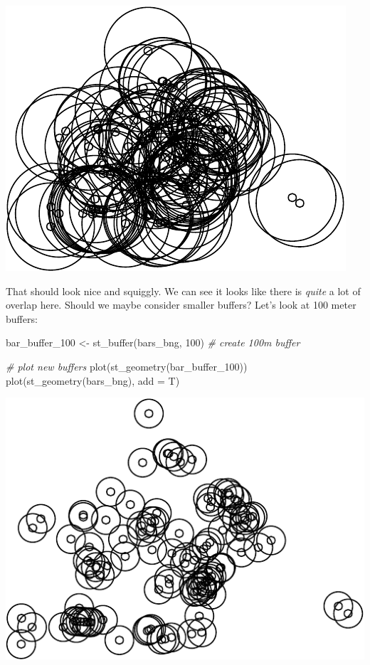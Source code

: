 \documentclass[
  krantz2]{krantz}
\makeatletter
\newenvironment{Shaded}{\begin{snugshade}}{\end{snugshade}}
\newcommand{\AttributeTok}[1]{\textcolor[rgb]{0.61,0.61,0.61}{#1}}
\newcommand{\CommentTok}[1]{\textcolor[rgb]{0.37,0.37,0.37}{\textit{#1}}}
\newcommand{\DecValTok}[1]{\textcolor[rgb]{0.06,0.06,0.06}{#1}}
\newcommand{\FunctionTok}[1]{\textcolor[rgb]{0,0,0}{#1}}
\newcommand{\NormalTok}[1]{#1}
\newcommand{\OtherTok}[1]{\textcolor[rgb]{0.37,0.37,0.37}{#1}}
\newenvironment{kframe}{%
\medskip{}
\setlength{\fboxsep}{.8em}
 \def\at@end@of@kframe{}%
 \ifinner\ifhmode%
  \def\at@end@of@kframe{\end{minipage}}%
  \begin{minipage}{\columnwidth}%
 \fi\fi%
 \def\FrameCommand##1{\hskip\@totalleftmargin \hskip-\fboxsep
 \colorbox{shadecolor}{##1}\hskip-\fboxsep
     \hskip-\linewidth \hskip-\@totalleftmargin \hskip\columnwidth}%
 \MakeFramed {\advance\hsize-\width
   \@totalleftmargin\z@ \linewidth\hsize
   \@setminipage}}%
 {\par\unskip\endMakeFramed%
 \at@end@of@kframe}
\renewenvironment{Shaded}{\begin{kframe}}{\end{kframe}}
\makeatother
\begin{document}
\includegraphics{crime_mapping_files/figure-latex/plot_buffers-1.pdf}

That should look nice and squiggly. We can see it looks like there is \emph{quite} a lot of overlap here. Should we maybe consider smaller buffers? Let's look at 100 meter buffers:

\begin{Shaded}
\begin{Highlighting}[]
\NormalTok{bar\_buffer\_100 }\OtherTok{\textless{}{-}} \FunctionTok{st\_buffer}\NormalTok{(bars\_bng, }\DecValTok{100}\NormalTok{) }\CommentTok{\# create 100m buffer}

\CommentTok{\# plot new buffers}
\FunctionTok{plot}\NormalTok{(}\FunctionTok{st\_geometry}\NormalTok{(bar\_buffer\_100))}
\FunctionTok{plot}\NormalTok{(}\FunctionTok{st\_geometry}\NormalTok{(bars\_bng), }\AttributeTok{add =}\NormalTok{ T)}
\end{Highlighting}
\end{Shaded}

\includegraphics{crime_mapping_files/figure-latex/smaller_buffers-1.pdf}
\end{document}

